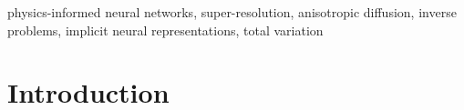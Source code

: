 \documentclass[conference]{IEEEtran}
\begin{document}
\begin{abstract}
Write the abstract here. Do not use math or special characters.
\end{abstract}

\begin{IEEEkeywords}
physics-informed neural networks, super-resolution, anisotropic
diffusion, inverse problems, implicit neural representations,
total variation
\end{IEEEkeywords}

\section{Introduction}
\end{document}
